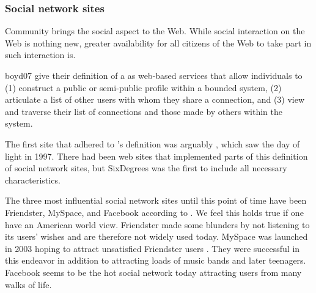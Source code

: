 \subsubsection{Social network sites}
\label{section:social.navigation.sociality.the.social.web.social.network.sites}
Community brings the social aspect to the Web. While social
interaction on the Web is nothing new, greater availability for all
citizens of the Web to take part in such interaction is.

\begin{fullquote}{boyd07}{%
  give their definition of a  as}
    web-based services that allow individuals to (1) construct a public
    or semi-public profile within a bounded system, (2) articulate a list of
    other users with whom they share a connection, and (3) view and traverse
    their list of connections and those made by others within the system.
\end{fullquote}

The first site that adhered to \citeauthor{boyd07}'s definition was arguably
, which saw the day of light in 1997.%
There had been web sites that implemented
parts of this definition of social network sites, but SixDegrees was the
first to include all necessary characteristics.

The three most influential social network sites until this point of time
have been Friendster,%
MySpace,%
and Facebook%
according to \citet{boyd07}. We feel this holds true if
one have an American world view.%
Friendster made some blunders by not listening to its users'
wishes and are therefore not widely used today. MySpace was launched in
2003 hoping to attract unsatisfied Friendster users \citep{boyd07}.
They were successful in this endeavor in addition to attracting loads of
music bands and later teenagers.
Facebook seems to be the hot social network today%
attracting users from many walks of life.

